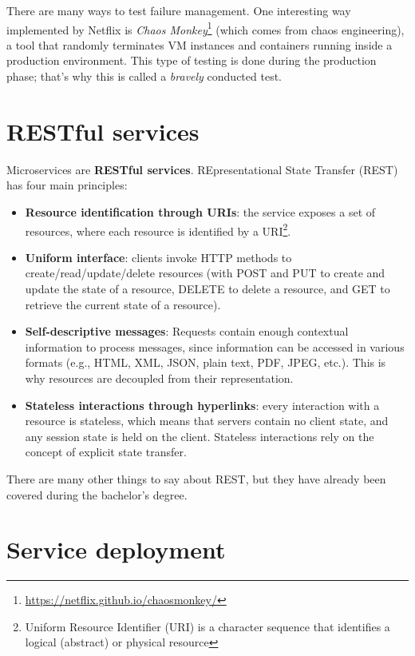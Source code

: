 There are many ways to test failure management. One interesting way implemented by Netflix is \textit{Chaos Monkey}\footnote{\url{https://netflix.github.io/chaosmonkey/}} (which comes from chaos engineering), a tool that randomly terminates VM instances and containers running inside a production environment. This type of testing is done during the production phase; that's why this is called a \textit{bravely} conducted test.

\section{RESTful services}

Microservices are \textbf{RESTful services}. REpresentational State Transfer (REST) has four main principles:

\begin{itemize}
    \item \textbf{Resource identification through URIs}: the service exposes a set of resources, where each resource is identified by a URI\footnote{Uniform Resource Identifier (URI) is a character sequence that identifies a logical (abstract) or physical resource}.
    \item \textbf{Uniform interface}: clients invoke HTTP methods to create/read/update/delete resources (with POST and PUT to create and update the state of a resource, DELETE to delete a resource, and GET to retrieve the current state of a resource).
    \item \textbf{Self-descriptive messages}: Requests contain enough contextual information to process messages, since information can be accessed in various formats (e.g., HTML, XML, JSON, plain text, PDF, JPEG, etc.). This is why resources are decoupled from their representation.
    \item \textbf{Stateless interactions through hyperlinks}: every interaction with a resource is stateless, which means that servers contain no client state, and any session state is held on the client. Stateless interactions rely on the concept of explicit state transfer.
\end{itemize}

There are many other things to say about REST, but they have already been covered during the bachelor's degree.

\section{Service deployment}

